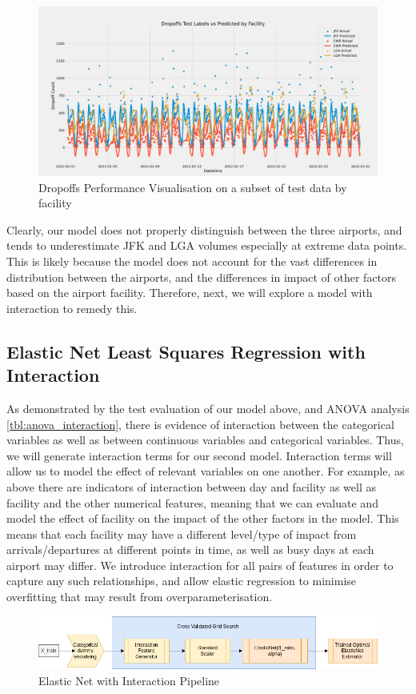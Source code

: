 \documentclass[11pt]{article}
\begin{document}
\begin{figure}[H]
    \centering
    \caption{Dropoffs Performance Visualisation on a subset of test data by facility}
    \label{fig:dropoffsperformance}
\includegraphics[width=1\textwidth]{plots/Dropoffs Test vs Predicted by Facility.png}
\end{figure}

Clearly, our model does not properly distinguish between the three airports, and tends to underestimate JFK and LGA volumes especially at extreme data points. This is likely because the model does not account for the vast differences in distribution between the airports, and the differences in impact of other factors based on the airport facility. Therefore, next, we will explore a model with interaction to remedy this.


\subsection{Elastic Net Least Squares Regression with Interaction}

As demonstrated by the test evaluation of our model above, and ANOVA analysis \ref{tbl:anova_interaction}, there is evidence of interaction between the categorical variables as well as between continuous variables and categorical variables. Thus, we will generate interaction terms for our second model. Interaction terms will allow us to model the effect of relevant variables on one another. For example, as above there are indicators of interaction between day and facility as well as facility and the other numerical features, meaning that we can evaluate and model the effect of facility on the impact of the other factors in the model. This means that each facility may have a different level/type of impact from arrivals/departures at different points in time, as well as busy days at each airport may differ. We introduce interaction for all pairs of features in order to capture any such relationships, and allow elastic regression to minimise overfitting that may result from overparameterisation.
\begin{figure}[h!]
    \centering
    \caption{Elastic Net with Interaction Pipeline}
    \label{fig:elasticnetinteraction_pipeline}
\includegraphics[width=1\textwidth]{plots/elasticnet_pipeline_interaction.png}
\end{figure}
\end{document}
